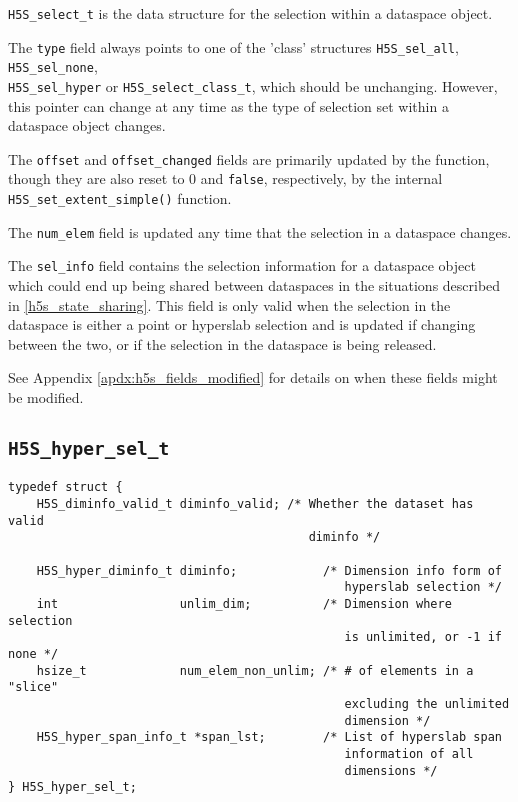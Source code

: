\documentclass[../HDF5_RFC.tex]{subfiles}
\begin{document}
\texttt{H5S\_select\_t} is the data structure for the selection within a dataspace
object.

The \texttt{type} field always points to one of the 'class' structures \texttt{H5S\_sel\_all},
\texttt{H5S\_sel\_none}, \\
\texttt{H5S\_sel\_hyper} or \texttt{H5S\_select\_class\_t}, which should be unchanging. However,
this pointer can change at any time as the type of selection set within a dataspace object changes.

The \texttt{offset} and \texttt{offset\_changed} fields are primarily updated by
the  function, though they are also reset to 0
and \texttt{false}, respectively, by the internal \texttt{H5S\_set\_extent\_simple()}
function.

The \texttt{num\_elem} field is updated any time that the selection in a dataspace
changes.

The \texttt{sel\_info} field contains the selection information for a dataspace
object which could end up being shared between dataspaces in the situations described
in \ref{h5s_state_sharing}. This field is only valid when the selection in the dataspace
is either a point or hyperslab selection and is updated if changing between the two,
or if the selection in the dataspace is being released.

See Appendix \ref{apdx:h5s_fields_modified} for details on when these fields might be
modified.

\subsection{\texttt{H5S\_hyper\_sel\_t}}
\label{apdx:h5s_struct_h5s_hyper_sel_t}

\begin{verbatim}
typedef struct {
    H5S_diminfo_valid_t diminfo_valid; /* Whether the dataset has valid
                                          diminfo */

    H5S_hyper_diminfo_t diminfo;            /* Dimension info form of
                                               hyperslab selection */
    int                 unlim_dim;          /* Dimension where selection
                                               is unlimited, or -1 if none */
    hsize_t             num_elem_non_unlim; /* # of elements in a "slice"
                                               excluding the unlimited
                                               dimension */
    H5S_hyper_span_info_t *span_lst;        /* List of hyperslab span
                                               information of all
                                               dimensions */
} H5S_hyper_sel_t;
\end{verbatim}
\end{document}
